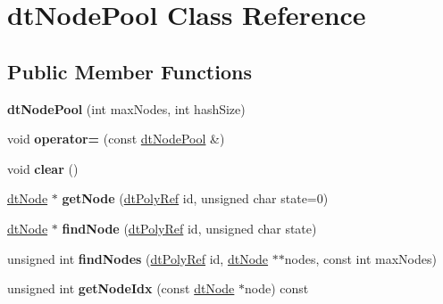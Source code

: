 \hypertarget{classdtNodePool}{}\section{dt\+Node\+Pool Class Reference}
\label{classdtNodePool}
\subsection*{Public Member Functions}
\begin{DoxyCompactItemize}
\item 
\mbox{\label{classdtNodePool_a7239dd92a9ea9b604c33a0a3472dc7ee}} 
{\bfseries dt\+Node\+Pool} (int max\+Nodes, int hash\+Size)
\item 
\mbox{\label{classdtNodePool_a73d74e12cae29e7b38938752cc5e1164}} 
void {\bfseries operator=} (const \hyperlink{classdtNodePool}{dt\+Node\+Pool} \&)
\item 
\mbox{\label{classdtNodePool_a4341af64b1f043b2775b7f1abae34d7b}} 
void {\bfseries clear} ()
\item 
\mbox{\label{classdtNodePool_a9642659acf1f7fbfcd408b4c3da8a885}} 
\hyperlink{structdtNode}{dt\+Node} $\ast$ {\bfseries get\+Node} (\hyperlink{group__detour_gab4e0b2257a670c1a800057999612b466}{dt\+Poly\+Ref} id, unsigned char state=0)
\item 
\mbox{\label{classdtNodePool_a3d824305e2dbebe242e9f664b3aaceb7}} 
\hyperlink{structdtNode}{dt\+Node} $\ast$ {\bfseries find\+Node} (\hyperlink{group__detour_gab4e0b2257a670c1a800057999612b466}{dt\+Poly\+Ref} id, unsigned char state)
\item 
\mbox{\label{classdtNodePool_a5fa3decff570f26616282fcf50a3e7f9}} 
unsigned int {\bfseries find\+Nodes} (\hyperlink{group__detour_gab4e0b2257a670c1a800057999612b466}{dt\+Poly\+Ref} id, \hyperlink{structdtNode}{dt\+Node} $\ast$$\ast$nodes, const int max\+Nodes)
\item 
\mbox{\label{classdtNodePool_a5b223e8441b2d202fb1a18022228d6e1}} 
unsigned int {\bfseries get\+Node\+Idx} (const \hyperlink{structdtNode}{dt\+Node} $\ast$node) const
\item 
$$
\end{DoxyCompactItemize}
